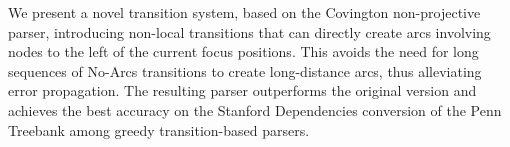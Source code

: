 We present a novel transition system, based on the Covington non-projective parser, introducing non-local transitions that can directly create arcs involving nodes to the left of the current focus positions. This avoids the need for long sequences of No-Arcs transitions to create long-distance arcs, thus alleviating error propagation. The resulting parser outperforms the original version and achieves the best accuracy on the Stanford Dependencies conversion of the Penn Treebank among greedy transition-based parsers.
